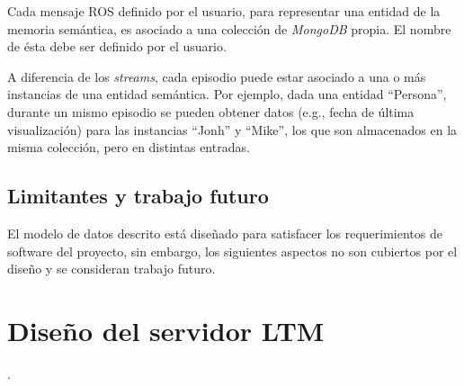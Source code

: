 Cada mensaje ROS definido por el usuario, para representar una entidad de la memoria semántica, es  asociado a una colección de \textit{MongoDB} propia. El nombre de ésta debe ser definido por el usuario. 

A diferencia de los \textit{streams}, cada episodio puede estar asociado a una o más instancias de una entidad semántica. Por ejemplo, dada una entidad ``Persona'', durante un mismo episodio se pueden obtener datos (e.g., fecha de última visualización) para las instancias ``Jonh'' y ``Mike'', los que son almacenados en la misma colección, pero en distintas entradas.








\subsection{Limitantes y trabajo futuro}

El modelo de datos descrito está diseñado para satisfacer los requerimientos de software del proyecto, sin embargo, los siguientes aspectos no son cubiertos por el diseño y se consideran trabajo futuro.




\section{Diseño del servidor LTM}
.

